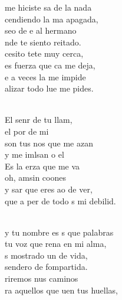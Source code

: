\documentclass[12pt]{article}
\begin{document}
\begin{multicols*}{2}
\begin{cancion}%
	 me hiciste sa de la nada \\
	cendiendo la ma apagada,\\
	seo de e al hermano\\
	nde te siento reitado.\\
\jump
	cesito tete muy cerca,\\
	es fuerza que ca me deja,\\
	e a veces la  me impide\\
	alizar todo lue me pides.\\\jump\\
	\begin{chorus}%
	El senr de tu llam,\\
	el por de mi\\
	son tus nos que me azan\\
	y me imlsan o el \\
	Es la erza que me va\\
	oh,  amsin coones\\
	y sar que eres ao de ver,\\
	que a per de todo s mi debilid.\\
	\end{chorus}%
	\jump\\
	y tu nombre es s que palabras\\
	 tu voz que rena en mi alma,\\
	s mostrado un  de vida,\\
	 sendero de fompartida.\\
\jump
	riremos nus caminos \\
	ra aquellos que uen tus huellas,\\

\end{cancion}
\end{multicols*}
\end{document}
